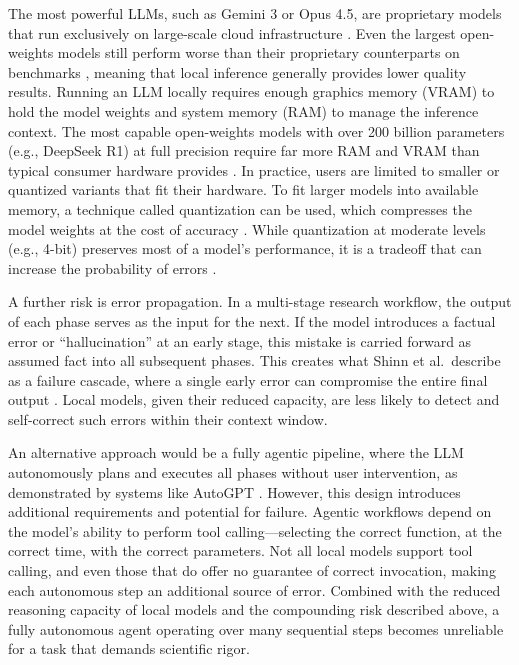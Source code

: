 The most powerful LLMs, such as Gemini 3 or Opus 4.5, are proprietary models that run exclusively on large-scale cloud infrastructure \cite{Zheng2024ChatbotArena}. 
Even the largest open-weights models still perform worse than their proprietary counterparts on benchmarks \cite{Zheng2024ChatbotArena}, meaning that local inference generally provides lower quality results.
Running an LLM locally requires enough graphics memory (VRAM) to hold the model weights and system memory (RAM) to manage the inference context. 
The most capable open-weights models with over 200 billion parameters (e.g., DeepSeek R1) at full precision require far more RAM and VRAM than typical consumer hardware provides \cite{Alizadeh-Vahid2023LLMIA}. 
In practice, users are limited to smaller or quantized variants that fit their hardware. 
To fit larger models into available memory, a technique called quantization can be used, which compresses the model weights at the cost of accuracy \cite{Gong2024LLMCBL}.
While quantization at moderate levels (e.g., 4-bit) preserves most of a model's performance, 
it is a tradeoff that can increase the probability of errors \cite{Dettmers2022}.

A further risk is error propagation. In a multi-stage research workflow, the output of each phase serves as the input for the next. 
If the model introduces a factual error or ``hallucination'' at an early stage, this mistake is carried forward as assumed fact into all subsequent phases. 
This creates what Shinn et al.\ describe as a failure cascade, where a single early error can compromise the entire final output \cite{Shinn2023}. 
Local models, given their reduced capacity, are less likely to detect and self-correct such errors within their context window.

An alternative approach would be a fully agentic pipeline, where the LLM autonomously plans and executes all phases 
without user intervention, as demonstrated by systems like AutoGPT \cite{Yang2023}. However, this design introduces 
additional requirements and potential for failure. Agentic workflows depend on the model's ability to perform 
tool calling---selecting the correct function, at the correct time, with the correct parameters. 
Not all local models support tool calling, and even those that do offer no guarantee of correct invocation, 
making each autonomous step an additional source of error. Combined with the reduced reasoning capacity of local 
models and the compounding risk described above, a fully autonomous agent operating over many sequential steps 
becomes unreliable for a task that demands scientific rigor.


